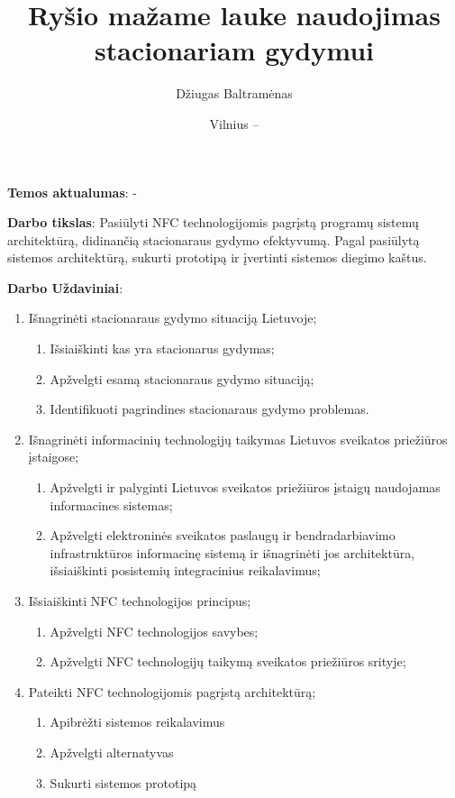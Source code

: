 \documentclass{VUMIFPSbakalaurinis}
\title{Ryšio mažame lauke naudojimas stacionariam gydymui}
\author{Džiugas Baltramėnas}
\date{Vilnius – \the\year}
\begin{document}
\maketitle

\tableofcontents

    \textbf{Temos aktualumas}: -

    \textbf{Darbo tikslas}: Pasiūlyti NFC technologijomis pagrįstą programų sistemų architektūrą, didinančią stacionaraus gydymo efektyvumą. Pagal pasiūlytą sistemos architektūrą, sukurti prototipą ir įvertinti sistemos diegimo kaštus.
    
    \textbf{Darbo Uždaviniai}:
    \begin{enumerate}
        \item Išnagrinėti stacionaraus gydymo situaciją Lietuvoje;
        \begin{enumerate}
            \item Išsiaiškinti kas yra stacionarus gydymas;
            \item Apžvelgti esamą stacionaraus gydymo situaciją;
            \item Identifikuoti pagrindines stacionaraus gydymo problemas.
        \end{enumerate}
        \item Išnagrinėti informacinių technologijų taikymas Lietuvos sveikatos priežiūros įstaigose;
        \begin{enumerate}
            \item Apžvelgti ir palyginti Lietuvos sveikatos priežiūros įstaigų naudojamas informacines sistemas;
            \item Apžvelgti elektroninės sveikatos paslaugų ir bendradarbiavimo infrastruktūros informacinę sistemą ir išnagrinėti jos architektūra, išsiaiškinti posistemių integracinius reikalavimus;
        \end{enumerate}
        \item Išsiaiškinti NFC technologijos principus;
        \begin{enumerate}
            \item Apžvelgti NFC technologijos savybes;
            \item Apžvelgti NFC technologijų taikymą sveikatos priežiūros srityje;
        \end{enumerate}
        \item Pateikti NFC technologijomis pagrįstą architektūrą;
        \begin{enumerate}
            \item Apibrėžti sistemos reikalavimus
            \item Apžvelgti alternatyvas
            \item Sukurti sistemos prototipą
        \end{enumerate}
    \end{enumerate}
\end{document}
